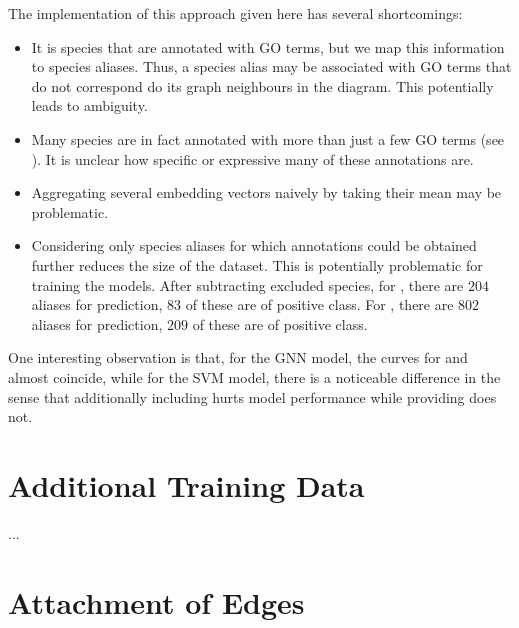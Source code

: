 \documentclass[
	fontsize=10pt, %
	twoside=false, %
	secnumdepth=1, %
  toc=indentunnumbered %
]{kaobook}
\begin{document}
The implementation of this approach given here has several shortcomings:
\begin{itemize}
  \item It is species that are annotated with GO terms, but we map this
    information to species aliases. Thus, a species alias may be associated with
    GO terms that do not correspond do its graph neighbours in the diagram. This
    potentially leads to ambiguity. 
\item Many species are in fact annotated with more than just a few GO terms (see
  ). It is unclear how specific or expressive many of
  these annotations are.
\item Aggregating several embedding vectors naively by taking their mean may be problematic.
\item Considering only species aliases for which annotations could be obtained
  further reduces the size of the dataset. This is potentially problematic for
  training the models. After subtracting excluded species, for \ADLast, there
  are $204$ aliases for prediction, $83$ of these are of positive class. For
  \PDMap, there are $802$ aliases for prediction, $209$ of these are of positive class.
\end{itemize}

One interesting observation is that, for the GNN model, the curves for
 and  almost coincide, while for the SVM
model, there is a noticeable difference in the sense that additionally including
 hurts model performance while providing 
does not.







\section{Additional Training Data}

...


\section{Attachment of Edges}
\end{document}
